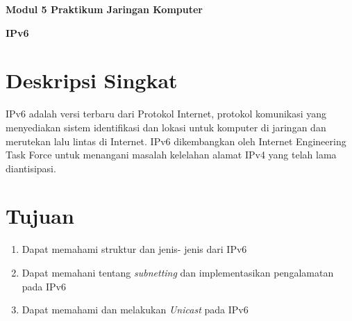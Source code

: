 \documentclass{article}
\begin{document}
    \begin{center}
        \textbf{Modul 5 Praktikum Jaringan Komputer}

        \textbf{IPv6}
    \end{center}

    \section*{Deskripsi Singkat}
    IPv6 adalah versi terbaru dari Protokol Internet, protokol komunikasi yang menyediakan sistem identifikasi dan lokasi untuk komputer di jaringan dan merutekan lalu lintas di Internet. IPv6 dikembangkan oleh Internet Engineering Task Force untuk menangani masalah kelelahan alamat IPv4 yang telah lama diantisipasi. 
    \section*{Tujuan}
    \begin{enumerate}
        \item Dapat memahami struktur dan jenis- jenis dari IPv6
        \item Dapat memahani tentang \textit{subnetting} dan implementasikan pengalamatan pada IPv6
        \item Dapat memahami dan melakukan \textit{Unicast} pada IPv6
    \end{enumerate}
\end{document}
